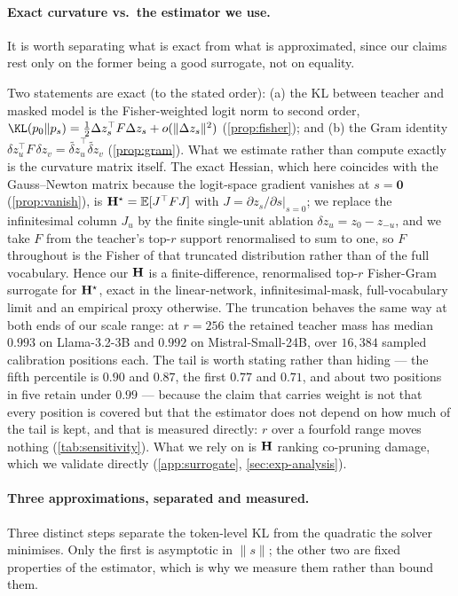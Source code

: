 \paragraph{Exact curvature vs.\ the estimator we use.} It is worth separating what is exact from what
is approximated, since our claims rest only on the former being a good surrogate, not on equality.
\begin{remark}\label{rem:exact}
Two statements are exact (to the stated order): (a) the KL between teacher and masked model is
the Fisher-weighted logit norm to second order,
$\KL(p_0\|p_s)=\tfrac12\Delta z_s^\top F\Delta z_s+o(\|\Delta z_s\|^2)$ (\cref{prop:fisher}); and (b) the Gram identity
$\delta z_u^\top F\,\delta z_v=\widetilde{\delta z}_u^\top\widetilde{\delta z}_v$ (\cref{prop:gram}).
What we estimate rather than compute exactly is the curvature matrix itself. The exact Hessian, which
here coincides with the Gauss--Newton matrix because the logit-space gradient vanishes at
$s=\mathbf 0$ (\cref{prop:vanish}), is $\mathbf{H}^\star=\mathbb{E}[J^\top F J]$ with $J=\partial z_s/\partial s|_{s=0}$;
we replace the infinitesimal column $J_u$ by the finite single-unit ablation
$\delta z_u=z_0-z_{-u}$, and we take $F$ from the teacher's top-$r$ support renormalised to sum to one,
so $F$ throughout is the Fisher of that truncated distribution rather than of the full vocabulary.
Hence our $\mathbf{H}$ is a finite-difference, renormalised top-$r$ Fisher-Gram surrogate for
$\mathbf{H}^\star$, exact in the linear-network, infinitesimal-mask, full-vocabulary limit and an empirical
proxy otherwise. The truncation behaves the same way at both ends of our
scale range: at $r{=}256$ the retained teacher mass has median $0.993$ on Llama-3.2-3B and $0.992$ on
Mistral-Small-24B, over $16{,}384$ sampled calibration positions each. The tail is worth stating
rather than hiding --- the fifth percentile is $0.90$ and $0.87$, the first $0.77$ and $0.71$, and
about two positions in five retain under $0.99$ --- because the claim that carries weight is not that
every position is covered but that the estimator does not depend on how much of the tail is kept, and
that is measured directly: $r$ over a fourfold range moves nothing (\cref{tab:sensitivity}). What we rely on is $\mathbf{H}$ ranking co-pruning damage,
which we validate directly (\cref{app:surrogate}, \cref{sec:exp-analysis}).
\end{remark}

\paragraph{Three approximations, separated and measured.}
Three distinct steps separate the token-level KL from the quadratic the solver minimises. Only the
first is asymptotic in $\|s\|$; the other two are fixed properties of the estimator, which is why we
measure them rather than bound them.

